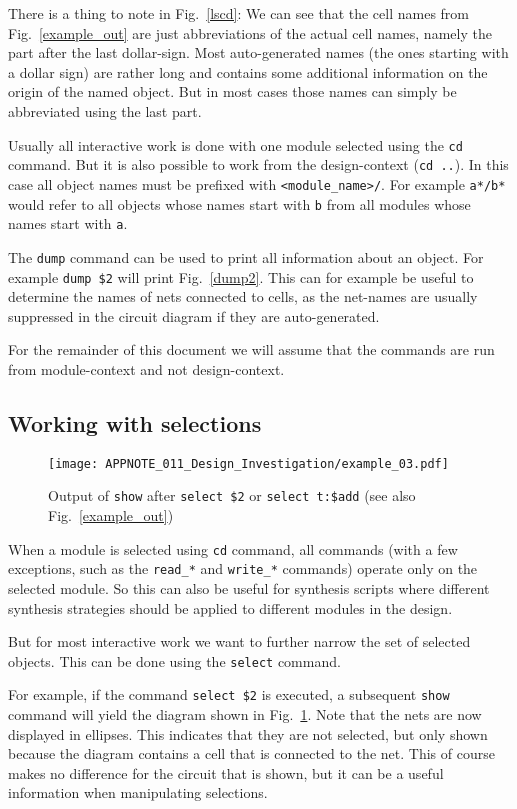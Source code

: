 \documentclass[9pt,technote,a4paper]{IEEEtran}
\begin{document}
There is a thing to note in Fig.~\ref{lscd}: We can see that the cell names
from Fig.~\ref{example_out} are just abbreviations of the actual cell names,
namely the part after the last dollar-sign. Most auto-generated names (the ones
starting with a dollar sign) are rather long and contains some additional
information on the origin of the named object. But in most cases those names
can simply be abbreviated using the last part.

Usually all interactive work is done with one module selected using the {\tt cd}
command. But it is also possible to work from the design-context ({\tt cd ..}). In
this case all object names must be prefixed with {\tt <module\_name>/}. For
example {\tt a*/b*} would refer to all objects whose names start with {\tt b} from
all modules whose names start with {\tt a}.

The {\tt dump} command can be used to print all information about an object.
For example {\tt dump \$2} will print Fig.~\ref{dump2}. This can for example
be useful to determine the names of nets connected to cells, as the net-names
are usually suppressed in the circuit diagram if they are auto-generated.

For the remainder of this document we will assume that the commands are run from
module-context and not design-context.

\subsection{Working with selections}

\begin{figure}[t]
\texttt{[image: APPNOTE\_011\_Design\_Investigation/example\_03.pdf]}
\caption{Output of {\tt show} after {\tt select \$2} or {\tt select t:\$add}
(see also Fig.~\ref{example_out})}
\label{seladd}
\end{figure}

When a module is selected using {\tt cd} command, all commands (with a few
exceptions, such as the {\tt read\_*} and {\tt write\_*} commands) operate
only on the selected module. So this can also be useful for synthesis scripts
where different synthesis strategies should be applied to different modules
in the design.

But for most interactive work we want to further narrow the set of selected
objects. This can be done using the {\tt select} command.

For example, if the command {\tt select \$2} is executed, a subsequent {\tt show}
command will yield the diagram shown in Fig.~\ref{seladd}. Note that the nets are
now displayed in ellipses. This indicates that they are not selected, but only
shown because the diagram contains a cell that is connected to the net. This
of course makes no difference for the circuit that is shown, but it can be a useful
information when manipulating selections.
\end{document}
